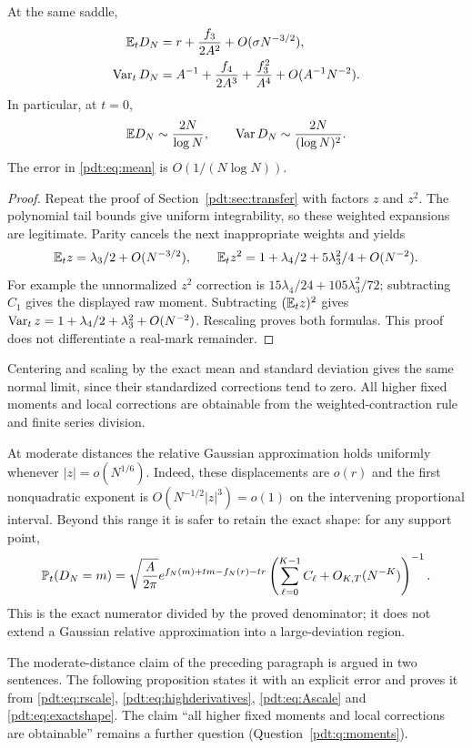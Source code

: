 \begin{proposition}\label{pdt:prop:moments}
At the same saddle,
\begin{align}
 \mathbb E_tD_N&=r+\frac{f_3}{2A^2}+O(\sigma N^{-3/2}),\label{pdt:eq:mean}\\
 \operatorname{Var}_tD_N&=A^{-1}+\frac{f_4}{2A^3}+\frac{f_3^2}{A^4}
                 +O(A^{-1}N^{-2}).\label{pdt:eq:variance}
\end{align}
In particular, at $t=0$,
\[
 \mathbb E D_N\sim\frac{2N}{\log N},\qquad
 \operatorname{Var} D_N\sim\frac{2N}{(\log N)^2}.
\]
The error in \eqref{pdt:eq:mean} is $O(1/(N\log N))$.
\end{proposition}
\begin{proof}
Repeat the proof of Section~\ref{pdt:sec:transfer} with factors $z$ and $z^2$. The polynomial tail bounds give uniform integrability, so these weighted expansions are legitimate. Parity cancels the next inappropriate weights and yields
\[
 \mathbb E_tz=\lambda_3/2+O(N^{-3/2}),\qquad
 \mathbb E_tz^2=1+\lambda_4/2+5\lambda_3^2/4+O(N^{-2}).
\]
For example the unnormalized $z^2$ correction is
$15\lambda_4/24+105\lambda_3^2/72$; subtracting $C_1$ gives the displayed raw moment. Subtracting $(\mathbb E_tz)^2$ gives
$\operatorname{Var}_tz=1+\lambda_4/2+\lambda_3^2+O(N^{-2})$.
Rescaling proves both formulas. This proof does not differentiate a real-mark remainder.
\end{proof}
Centering and scaling by the exact mean and standard deviation gives the same normal limit, since their standardized corrections tend to zero. All higher fixed moments and local corrections are obtainable from the weighted-contraction rule and finite series division.

At moderate distances the relative Gaussian approximation holds uniformly whenever $|z|=o(N^{1/6})$. Indeed, these displacements are $o(r)$ and the first nonquadratic exponent is $O(N^{-1/2}|z|^3)=o(1)$ on the intervening proportional interval. Beyond this range it is safer to retain the exact shape: for any support point,
\begin{equation}\label{pdt:eq:exactshape}
 \mathbb P_t(D_N=m)=\sqrt{\frac A{2\pi}}
 e^{f_N(m)+tm-f_N(r)-tr}
 \left(\sum_{\ell=0}^{K-1}C_\ell+O_{K,T}(N^{-K})\right)^{-1}.
\end{equation}
This is the exact numerator divided by the proved denominator; it does not extend a Gaussian relative approximation into a large-deviation region.

\begin{writenote}
The moderate-distance claim of the preceding paragraph is argued in two
sentences. The following proposition states it with an explicit error and
proves it from \eqref{pdt:eq:rscale}, \eqref{pdt:eq:highderivatives},
\eqref{pdt:eq:Ascale} and \eqref{pdt:eq:exactshape}. The claim ``all higher fixed moments and local
corrections are obtainable'' remains a further question
(Question~\ref{pdt:q:moments}).
\end{writenote}

